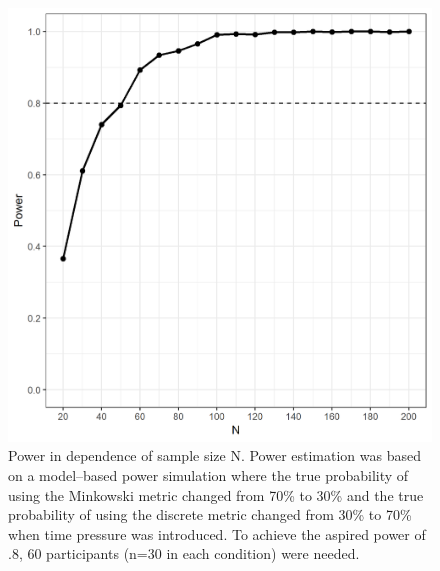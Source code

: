 \documentclass[a4paper,man,natbib]{apa6}
\begin{document}
\begin{figure}[htbp]
\centering
\includegraphics[width = \textwidth]{fig_power.png}
\caption{Power in dependence of sample size N. Power estimation was based on a model--based power simulation where the true probability of using the Minkowski metric changed from 70\% to 30\% and the true probability of using the discrete metric changed from 30\% to 70\% when time pressure was introduced. To achieve the aspired power of .8, 60 participants (n=30 in each condition) were needed.}
\label{fig:power}
\end{figure}
\end{document}
